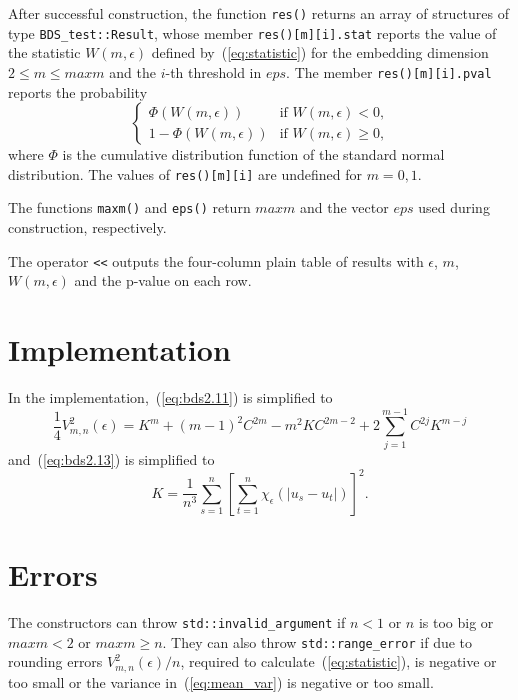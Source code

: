 \documentclass[a4paper,11pt]{article}
\begin{document}
After successful construction, the function \verb|res()| returns an
array of structures of type \verb|BDS_test::Result|, whose member
\verb|res()[m][i].stat| reports the value of the statistic $W(m,
\epsilon)$ defined by~(\ref{eq:statistic}) for the embedding dimension
$2 \leq m \leq \mathit{maxm}$ and the $i$-th threshold in
$\mathit{eps}$. The member \verb|res()[m][i].pval| reports the
probability
\[ \left\{ \begin{array}{ll}
  \Phi(W(m, \epsilon)) & \mbox{if $W(m, \epsilon) < 0$,} \\
  1 - \Phi(W(m, \epsilon)) & \mbox{if $W(m, \epsilon) \geq 0$,}
\end{array} \right. \]
where $\Phi$ is the cumulative distribution function of the standard
normal distribution. The values of \verb|res()[m][i]| are undefined
for $m = 0, 1$.

The functions \verb|maxm()| and \verb|eps()| return $\mathit{maxm}$
and the vector $\mathit{eps}$ used during construction, respectively.

The operator \verb|<<| outputs the four-column plain table of results
with $\mathit{\epsilon}$, $m$, $W(m, \epsilon)$ and the p-value on
each row.

\section{Implementation}

In the implementation,~(\ref{eq:bds2.11}) is simplified to
\begin{equation} \label{eq:simpleV}
  \frac{1}{4}V_{m, n}^2(\epsilon) = K^m + (m - 1)^2 C^{2m} - m^2 K
  C^{2m -2} + 2 \sum_{j = 1}^{m - 1} C^{2j} K^{m - j}
\end{equation}
and~(\ref{eq:bds2.13}) is simplified to
\begin{equation} \label{eq:bds2.13s}
  K = \frac{1}{n^3} \sum_{s = 1}^n \left[ \sum_{t = 1}^n
    \chi_{\epsilon}(|u_s - u_t|) \right]^2.
\end{equation}

\section{Errors}

The constructors can throw \verb|std::invalid_argument| if $n < 1$ or
$n$ is too big or $\mathit{maxm} < 2$ or $\mathit{maxm} \geq n$. They
can also throw \verb|std::range_error| if due to rounding errors
$V_{m, n}^2(\epsilon) / n$, required to
calculate~(\ref{eq:statistic}), is negative or too small or the
variance in~(\ref{eq:mean_var}) is negative or too small.
\end{document}
